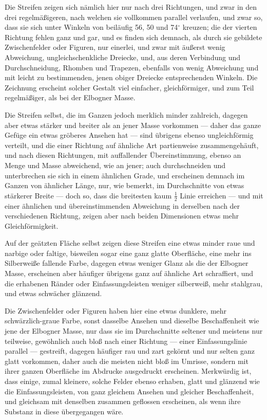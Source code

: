 \documentclass[a4paper, 11pt, oneside, german]{article}
\begin{document}
Die Streifen zeigen sich nämlich hier nur nach drei Richtungen, und zwar in den drei regelmäßigeren, nach welchen sie vollkommen parallel verlaufen, und zwar so, dass sie sich unter Winkeln von beiläufig 56, 50 und 74$^{\circ}$ kreuzen; die der vierten Richtung fehlen ganz und gar, und es finden sich demnach, als durch sie gebildete Zwischenfelder oder Figuren, nur einerlei, und zwar mit äußerst wenig Abweichung, ungleichschenkliche Dreiecke, und, aus deren Verbindung und Durchschneidung, Rhomben und Trapezen, ebenfalls von wenig Abweichung und mit leicht zu bestimmenden, jenen obiger Dreiecke entsprechenden Winkeln. Die Zeichnung erscheint solcher Gestalt viel einfacher, gleichförmiger, und zum Teil regelmäßiger, als bei der Elbogner Masse.

Die Streifen selbst, die im Ganzen jedoch merklich minder zahlreich, dagegen aber etwas stärker und breiter als an jener Masse vorkommen --- daher das ganze Gefüge ein etwas gröberes Ansehen hat --- sind übrigens ebenso ungleichförmig verteilt, und die einer Richtung auf ähnliche Art partienweise zusammengehäuft, und nach diesen Richtungen, mit auffallender Übereinstimmung, ebenso an Menge und Masse abweichend, wie an jener; auch durchschneiden und unterbrechen sie sich in einem ähnlichen Grade, und erscheinen demnach im Ganzen von ähnlicher Länge, nur, wie bemerkt, im Durchschnitte von etwas stärkerer Breite --- doch so, dass die breitesten kaum $\frac{1}{2}$ Linie erreichen --- und mit einer ähnlichen und übereinstimmenden Abweichung in derselben nach der verschiedenen Richtung, zeigen aber nach beiden Dimensionen etwas mehr Gleichförmigkeit.

Auf der geätzten Fläche selbst zeigen diese Streifen eine etwas minder raue und narbige oder faltige, bisweilen sogar eine ganz glatte Oberfläche, eine mehr ins Silberweiße fallende Farbe, dagegen etwas weniger Glanz als die der Elbogner Masse, erscheinen aber häufiger übrigens ganz auf ähnliche Art schraffiert, und die erhabenen Ränder oder Einfassungsleisten weniger silberweiß, mehr stahlgrau, und etwas schwächer glänzend.

Die Zwischenfelder oder Figuren haben hier eine etwas dunklere, mehr schwärzlich-graue Farbe, sonst dasselbe Ansehen und dieselbe Beschaffenheit wie jene der Elbogner Masse, nur dass sie im Durchschnitte seltener und meistens nur teilweise, gewöhnlich auch bloß nach einer Richtung --- einer Einfassungslinie parallel --- gestreift, dagegen häufiger rau und zart gekörnt und nur selten ganz glatt vorkommen, daher auch die meisten nicht bloß im Umrisse, sondern mit ihrer ganzen Oberfläche im Abdrucke ausgedruckt erscheinen. Merkwürdig ist, dass einige, zumal kleinere, solche Felder ebenso erhaben, glatt und glänzend wie die Einfassungsleisten, von ganz gleichem Ansehen und gleicher Beschaffenheit, und gleichsam mit denselben zusammen geflossen erscheinen, als wenn ihre Substanz in diese übergegangen wäre.
\end{document}
